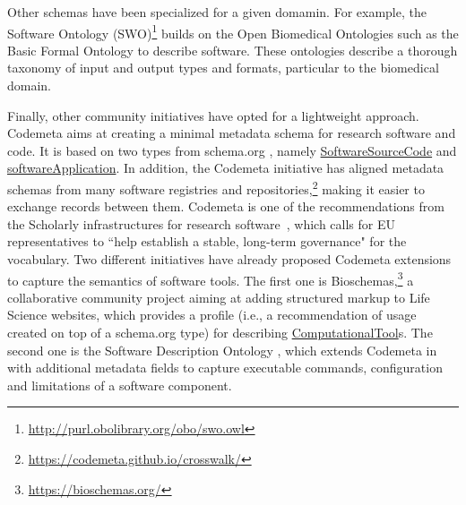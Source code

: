 Other schemas have been specialized for a given domamin. For example, the Software Ontology (SWO)\footnote{\url{http://purl.obolibrary.org/obo/swo.owl}} builds on the Open Biomedical Ontologies such as the Basic Formal Ontology \cite{spear2016functions} to describe software. These ontologies describe a thorough taxonomy of input and output types and formats, particular to the biomedical domain.

Finally, other community initiatives have opted for a lightweight approach. Codemeta \cite{Boettigeral2017} aims at creating a minimal metadata schema for research software and code. It is based on two types from schema.org \cite{guha_schemaorg_2016}, namely \href{https://schema.org/SoftwareSourceCode}{SoftwareSourceCode} and \href{https://schema.org/SoftwareApplication}{softwareApplication}. In addition, the Codemeta initiative has aligned metadata schemas from many software registries and repositories,\footnote{\url{https://codemeta.github.io/crosswalk/}} making it easier to exchange records between them. Codemeta is one of the recommendations from the Scholarly infrastructures for research software~\cite{sirs_2019}, which calls for EU representatives to ``help establish a stable, long-term governance" for the vocabulary. Two different initiatives have already proposed Codemeta extensions to capture the semantics of software tools. The first one is Bioschemas,\footnote{\url{https://bioschemas.org/}} a collaborative community project aiming at adding structured markup to Life Science websites, which provides a profile (i.e., a recommendation of usage created on top of a schema.org type) for describing \href{https://bioschemas.org/profiles/ComputationalTool}{ComputationalTool}s. The second one is the Software Description Ontology \cite{garijo2019okg}, which extends Codemeta in with additional metadata fields to capture executable commands, configuration and limitations of a software component. 




